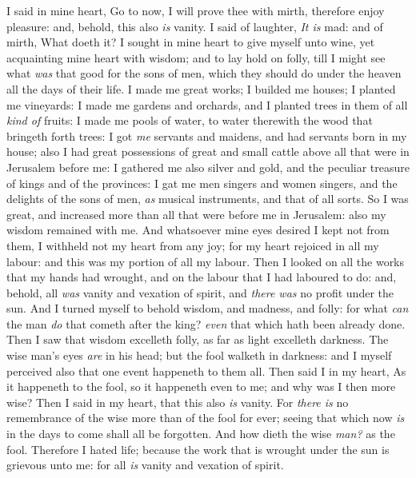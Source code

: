 \documentclass[11pt,letterpaper,oneside]{memoir}
\begin{document}
I said in mine heart, Go to now, I will prove thee with mirth, therefore 
enjoy pleasure: and, behold, this also \emph{is} vanity. I said of 
laughter, \emph{It is} mad: and of mirth, What doeth it? I sought in 
mine heart to give myself unto wine, yet acquainting mine heart with 
wisdom; and to lay hold on folly, till I might see what \emph{was} that 
good for the sons of men, which they should do under the heaven all the 
days of their life. I made me great works; I builded me houses; I 
planted me vineyards: I made me gardens and orchards, and I planted 
trees in them of all \emph{kind of} fruits: I made me pools of water, to 
water therewith the wood that bringeth forth trees: I got \emph{me} 
servants and maidens, and had servants born in my house; also I had 
great possessions of great and small cattle above all that were in 
Jerusalem before me: I gathered me also silver and gold, and the 
peculiar treasure of kings and of the provinces: I gat me men singers 
and women singers, and the delights of the sons of men, \emph{as} 
musical instruments, and that of all sorts. So I was great, and 
increased more than all that were before me in Jerusalem: also my wisdom 
remained with me. And whatsoever mine eyes desired I kept not from them, 
I withheld not my heart from any joy; for my heart rejoiced in all my 
labour: and this was my portion of all my labour. Then I looked on all 
the works that my hands had wrought, and on the labour that I had 
laboured to do: and, behold, all \emph{was} vanity and vexation of 
spirit, and \emph{there was} no profit under the sun. And I turned 
myself to behold wisdom, and madness, and folly: for what \emph{can} the 
man \emph{do} that cometh after the king? \emph{even} that which hath 
been already done. Then I saw that wisdom excelleth folly, as far as 
light excelleth darkness. The wise man's eyes \emph{are} in his head; 
but the fool walketh in darkness: and I myself perceived also that one 
event happeneth to them all. Then said I in my heart, As it happeneth to 
the fool, so it happeneth even to me; and why was I then more wise? Then 
I said in my heart, that this also \emph{is} vanity. For \emph{there is} 
no remembrance of the wise more than of the fool for ever; seeing that 
which now \emph{is} in the days to come shall all be forgotten. And how 
dieth the wise \emph{man?} as the fool. Therefore I hated life; because 
the work that is wrought under the sun is grievous unto me: for all 
\emph{is} vanity and vexation of spirit. 
\end{document}
